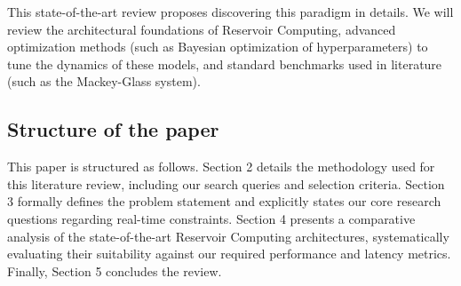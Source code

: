 \vspace{0.5cm}

This state-of-the-art review proposes discovering this paradigm in details. We will review the architectural foundations of Reservoir Computing, advanced optimization methods (such as Bayesian optimization of hyperparameters) to tune the dynamics of these models, and standard benchmarks used in literature (such as the Mackey-Glass system)\cite{mackey1977oscillation}.

\subsection{Structure of the paper}

This paper is structured as follows. Section 2 details the methodology used for this literature review, including our search queries and selection criteria. Section 3 formally defines the problem statement and explicitly states our core research questions regarding real-time constraints. Section 4 presents a comparative analysis of the state-of-the-art Reservoir Computing architectures, systematically evaluating their suitability against our required performance and latency metrics. Finally, Section 5 concludes the review.